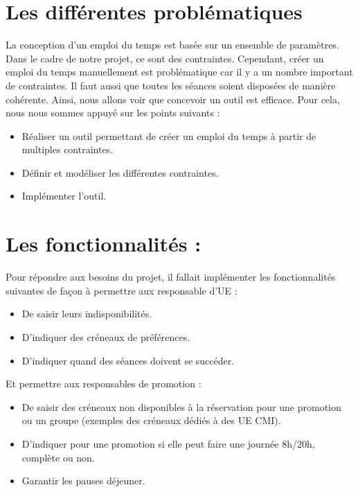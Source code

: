 \documentclass[12pt,a4paper,openany]{memoir}
\begin{document}
\section{Les différentes problématiques}
\par
La conception d'un emploi du temps est basée sur un ensemble de paramètres. Dans le cadre de notre projet, ce sont des contraintes. Cependant, créer un emploi du temps manuellement est problématique car il y a un nombre important de contraintes. Il faut aussi que toutes les séances soient disposées de manière cohérente. Ainsi, nous allons voir que concevoir un outil est efficace. Pour cela, nous nous sommes appuyé sur les points suivants :
\begin{itemize}
    \item Réaliser un outil permettant de créer un emploi du temps à partir de multiples contraintes. 
    \item Définir et modéliser les différentes contraintes.
    \item Implémenter l'outil.
\end{itemize}

\section{Les fonctionnalités :}
\par
Pour répondre aux besoins du projet, il fallait implémenter les fonctionnalités suivantes de façon à permettre aux responsable d'UE :
\begin{itemize}
	\item De saisir leurs indisponibilités.
	\item D'indiquer des créneaux de préférences.
	\item D'indiquer quand des séances doivent se succéder.
\end{itemize}
\par
Et permettre aux responsables de promotion :
\begin{itemize}
	\item De saisir des créneaux non disponibles à la réservation pour une promotion ou un groupe (exemples des créneaux dédiés à des UE CMI). 
	\item D'indiquer pour une promotion si elle peut faire une journée 8h/20h, complète ou non.
	\item Garantir les pauses déjeuner.
\end{itemize}
\clearpage
\end{document}
